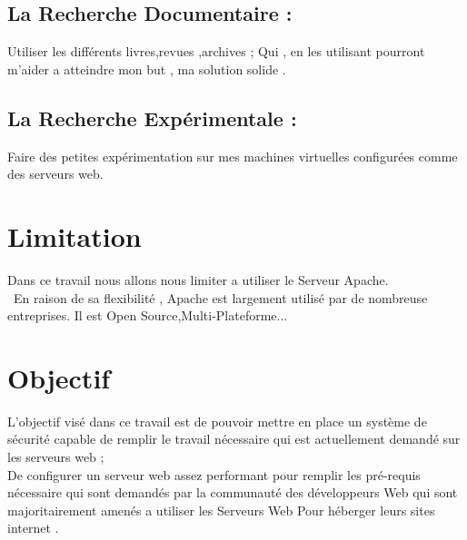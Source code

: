   \subsection{La Recherche Documentaire :}
    Utiliser les différents livres,revues ,archives ;
    Qui , en les utilisant pourront m'aider a atteindre mon but , ma solution solide .
 \subsection{La Recherche Expérimentale :}
   Faire des petites expérimentation sur mes machines virtuelles configurées comme des serveurs web.
 \section{Limitation} Dans ce travail nous allons nous limiter a utiliser  le Serveur Apache.\\\
 En raison de sa flexibilité , Apache est largement utilisé  par de nombreuse entreprises.
 Il est Open Source,Multi-Plateforme... 
  \section{Objectif}
 L'objectif visé  dans ce travail est de pouvoir mettre en place un système de sécurité capable de remplir le travail nécessaire qui est actuellement demandé  sur les serveurs web ;\\ 
   De configurer un serveur web assez performant pour remplir les pré-requis    nécessaire qui sont demandés par la communauté  des développeurs   Web qui sont majoritairement amenés a utiliser les Serveurs Web Pour héberger leurs sites internet  .

 
   
   

   
   
     
 